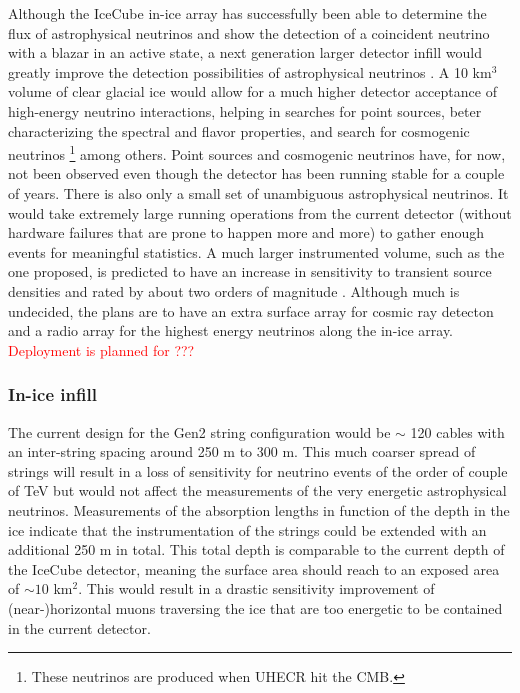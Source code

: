 \noindent Although the IceCube in-ice array has successfully been able to determine the flux of astrophysical neutrinos and show the detection of a coincident neutrino with a blazar in an active state, a next generation larger detector infill would greatly improve the detection possibilities of astrophysical neutrinos \cite{Blaufuss:2015muc}. A 10 km$^3$ volume of clear glacial ice would allow for a much higher detector acceptance of high-energy neutrino interactions, helping in searches for point sources, beter characterizing the spectral and flavor properties, and search for cosmogenic neutrinos \footnote{These neutrinos are produced when UHECR hit the CMB.} among others. Point sources and cosmogenic neutrinos have, for now, not been observed even though the detector has been running stable for a couple of years. There is also only a small set of unambiguous astrophysical neutrinos. It would take extremely large running operations from the current detector (without hardware failures that are prone to happen more and more) to gather enough events for meaningful statistics. A much larger instrumented volume, such as the one proposed, is predicted to have an increase in sensitivity to transient source densities and rated by about two orders of magnitude \cite{Ahlers:2014ioa}. Although much is undecided, the plans are to have an extra surface array for cosmic ray detecton and a radio array for the highest energy neutrinos along the in-ice array.\\
\newline
\textcolor{red}{Deployment is planned for ???}

\subsubsection{In-ice infill}
The current design for the Gen2 string configuration would be $\sim$ 120 cables with an inter-string spacing around 250 m to 300 m. This much coarser spread of strings will result in a loss of sensitivity for neutrino events of the order of couple of TeV but would not affect the measurements of the very energetic astrophysical neutrinos. Measurements of the absorption lengths in function of the depth in the ice indicate that the instrumentation of the strings could be extended with an additional 250 m in total. This total depth is comparable to the current depth of the IceCube detector, meaning the surface area should reach to an exposed area of $\sim 10$ km$^2$. This would result in a drastic sensitivity improvement of (near-)horizontal muons traversing the ice that are too energetic to be contained in the current detector.
